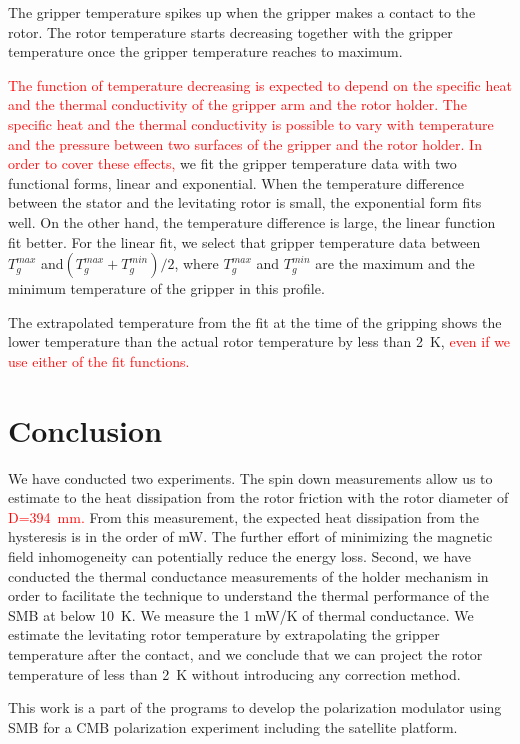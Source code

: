 \documentclass[journal]{IEEEtran}
\def\cred{\textcolor{red}}
\begin{document}
The gripper temperature spikes up when the gripper makes a contact to the rotor.
The rotor temperature starts decreasing together with the gripper temperature once the gripper temperature reaches to maximum.

\cred{ The function of temperature decreasing is expected to depend on the specific heat and the thermal conductivity of the gripper arm and the rotor holder.}
\cred{ The specific heat and the thermal conductivity is possible to vary with temperature and the pressure between two surfaces of the gripper and the rotor holder.}
\cred{ In order to cover these effects,} we fit the gripper temperature data with two functional forms, linear and exponential.
When the temperature difference between the stator and the levitating rotor is small, the exponential form fits well.
On the other hand, the temperature difference is large, the linear function fit better.
For the linear fit, we select that gripper temperature data between $T_g^{max}$ and$(T_g^{max}+T_g^{min})/2$,
where $T_g^{max}$ and $T_g^{min}$ are the maximum and the minimum temperature of the gripper in this profile.

The extrapolated temperature from the fit at the time of the gripping shows the lower temperature than the actual rotor temperature by less than 2~K,
\cred{ even if we use either of the fit functions. }

\section{Conclusion}
We have conducted two experiments.
The spin down measurements allow us to estimate to the heat dissipation from the rotor friction with the rotor diameter of \cred{D=394~mm.}
From this measurement, the expected heat dissipation from the hysteresis is in the order of mW.
The further effort of minimizing the magnetic field inhomogeneity can potentially reduce the energy loss.
Second, we have conducted the thermal conductance measurements of the holder mechanism in order to facilitate the technique to understand the thermal performance of the SMB at below 10~K.
We measure the 1 mW/K of thermal conductance.
We estimate the levitating rotor temperature by extrapolating the gripper temperature after the contact, and we conclude that we can project the rotor temperature of less than 2~K without introducing any correction method.

This work is a part of the programs to develop the polarization modulator using SMB for a CMB polarization experiment including the satellite platform.
\end{document}
